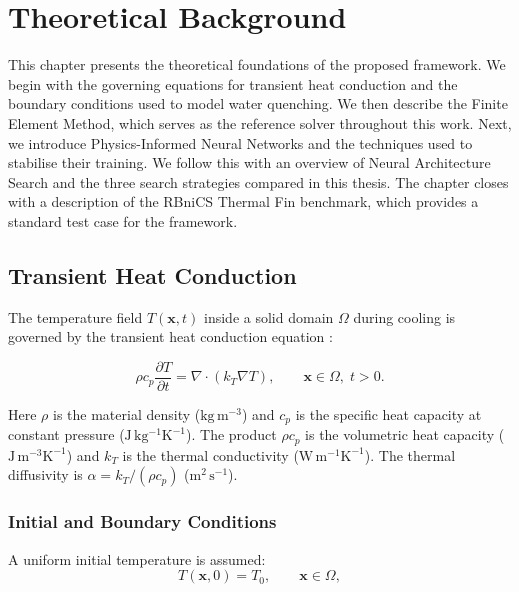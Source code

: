 \chapter{Theoretical Background}
\label{chap:theory}

This chapter presents the theoretical foundations of the proposed framework.
We begin with the governing equations for transient heat conduction and the
boundary conditions used to model water quenching.
We then describe the Finite Element Method, which serves as the reference
solver throughout this work.
Next, we introduce Physics-Informed Neural Networks and the techniques used
to stabilise their training.
We follow this with an overview of Neural Architecture Search and the three
search strategies compared in this thesis.
The chapter closes with a description of the RBniCS Thermal Fin benchmark,
which provides a standard test case for the framework.

\section{Transient Heat Conduction}
\label{sec:heat_theory}

The temperature field $T(\mathbf{x},t)$ inside a solid domain $\Omega$ during
cooling is governed by the transient heat conduction equation
\cite{xiao2010,wang2019quenching}:

\begin{equation}
\rho c_p \frac{\partial T}{\partial t}
= \nabla \cdot (k_T \nabla T),
\qquad \mathbf{x}\in\Omega,\; t>0.
\label{eq:heat_full}
\end{equation}

Here $\rho$ is the material density ($\mathrm{kg\,m^{-3}}$) and $c_p$ is the
specific heat capacity at constant pressure ($\mathrm{J\,kg^{-1}K^{-1}}$).
The product $\rho c_p$ is the volumetric heat capacity
($\mathrm{J\,m^{-3}K^{-1}}$) and $k_T$ is the thermal conductivity
($\mathrm{W\,m^{-1}K^{-1}}$).
The thermal diffusivity is $\alpha = k_T / (\rho c_p)$
($\mathrm{m^2\,s^{-1}}$).

\subsection{Initial and Boundary Conditions}

A uniform initial temperature is assumed:
\begin{equation}
T(\mathbf{x},0) = T_0, \qquad \mathbf{x}\in\Omega,
\label{eq:ic}
\end{equation}

